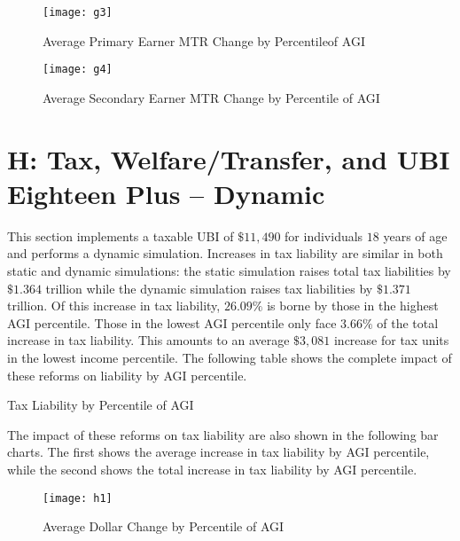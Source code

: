 \documentclass{article}
\begin{document}
\begin{figure}[H]
\centering
\caption{Average Primary Earner MTR Change by Percentileof AGI}
\texttt{[image: g3]}
\end{figure}

\begin{figure}[H]
\centering
\caption{Average Secondary Earner MTR Change by Percentile of AGI}
\texttt{[image: g4]}
\end{figure}

\section{H: Tax, Welfare/Transfer, and UBI Eighteen Plus -- Dynamic}
This section implements a taxable UBI of $\$11,490$ for individuals $18$ years of age and performs a dynamic simulation. Increases in tax liability are similar in both static and dynamic simulations: the static simulation raises total tax liabilities by $\$1.364$ trillion while the dynamic simulation raises tax liabilities by $\$1.371$ trillion. Of this increase in tax liability, $26.09\%$ is borne by those in the highest AGI percentile. Those in the lowest AGI percentile only face $3.66\%$ of the total increase in tax liability. This amounts to an average $\$3,081$ increase for tax units in the lowest income percentile. The following table shows the complete impact of these reforms on liability by AGI percentile.

\begin{table}[H]
\caption{Tax Liability by Percentile of AGI}

\begin{center}
\begin{adjustbox}{max width=\textwidth}

\end{adjustbox}
\end{center}
\end{table}

The impact of these reforms on tax liability are also shown in the following bar charts. The first shows the average increase in tax liability by AGI percentile, while the second shows the total increase in tax liability by AGI percentile.

\begin{figure}[H]
\centering
\caption{Average Dollar Change by Percentile of AGI}
\texttt{[image: h1]}
\end{figure}
\end{document}
